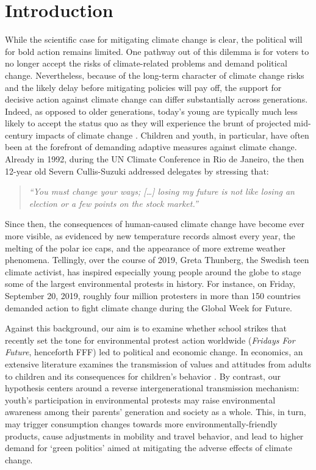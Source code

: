 

\section{Introduction}\label{sec_greta_cons:intro}
While the scientific case for mitigating climate change is clear, the political will for bold action remains limited. One pathway out of this dilemma is for voters to no longer accept the risks of climate-related problems and demand political change. Nevertheless, because of the long-term character of climate change risks and the likely delay before mitigating policies will pay off, the support for decisive action against climate change can differ substantially across generations. Indeed, as opposed to older generations, today's young are typically much less likely to accept the status quo as they will experience the brunt of projected mid-century impacts of climate change \citep{hersch2006generational}. Children and youth, in particular, have often been at the forefront of demanding adaptive measures against climate change. Already in 1992, during the UN Climate Conference in Rio de Janeiro, the then 12-year old Severn Cullis-Suzuki addressed delegates by stressing that: 
\begin{quote}
	\textit{``You must change your ways; […] losing my future is not like losing an election or a few points on the stock market.''}
\end{quote}
Since then, the consequences of human-caused climate change have become ever more visible, as evidenced by new temperature records almost every year, the melting of the polar ice caps, and the appearance of more extreme weather phenomena. Tellingly, over the course of 2019, Greta Thunberg, the Swedish teen climate activist, has inspired especially young people around the globe to stage some of the largest environmental protests in history. For instance, on Friday, September 20, 2019, roughly four million protesters in more than 150 countries demanded action to fight climate change during the Global Week for Future. 


Against this background, our aim is to examine whether school strikes that recently set the tone for environmental protest action worldwide (\textit{Fridays For Future}, henceforth FFF) led to political and economic change. In economics, an extensive literature examines the transmission of values and attitudes from adults to children and its consequences for children's behavior \citep{bisin2001economics,figlio2019longterm}. By contrast, our hypothesis centers around a reverse intergenerational transmission mechanism: youth's participation in environmental protests may raise environmental awareness among their parents' generation and society as a whole. This, in turn, may trigger consumption changes towards more environmentally-friendly products, cause adjustments in mobility and travel behavior, and lead to higher demand for `green politics' aimed at mitigating the adverse effects of climate change. 

